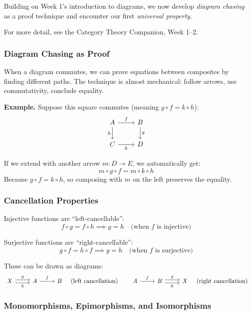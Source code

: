 \begin{goingdeeper}
Building on Week 1's introduction to diagrams, we now develop \emph{diagram chasing} as a proof technique and encounter our first \emph{universal property}.

For more detail, see the Category Theory Companion, Week 1--2.

\subsubsection*{Diagram Chasing as Proof}

When a diagram commutes, we can prove equations between composites by finding different paths. The technique is almost mechanical: follow arrows, use commutativity, conclude equality.

\textbf{Example.} Suppose this square commutes (meaning $g \circ f = k \circ h$):
\[
\begin{tikzcd}
A \arrow[r, "f"] \arrow[d, "h"'] & B \arrow[d, "g"] \\
C \arrow[r, "k"'] & D
\end{tikzcd}
\]

If we extend with another arrow $m: D \to E$, we automatically get:
\[
m \circ g \circ f = m \circ k \circ h
\]
Because $g \circ f = k \circ h$, so composing with $m$ on the left preserves the equality.

\subsubsection*{Cancellation Properties}

Injective functions are ``left-cancellable'':
\[
f \circ g = f \circ h \implies g = h \quad \text{(when } f \text{ is injective)}
\]

Surjective functions are ``right-cancellable'':
\[
g \circ f = h \circ f \implies g = h \quad \text{(when } f \text{ is surjective)}
\]

These can be drawn as diagrams:
\[
\begin{tikzcd}
X \arrow[r, shift left, "g"] \arrow[r, shift right, "h"'] & A \arrow[r, "f"] & B
\end{tikzcd}
\quad\text{(left cancellation)}
\qquad
\begin{tikzcd}
A \arrow[r, "f"] & B \arrow[r, shift left, "g"] \arrow[r, shift right, "h"'] & X
\end{tikzcd}
\quad\text{(right cancellation)}
\]

\subsubsection*{Monomorphisms, Epimorphisms, and Isomorphisms}


\end{goingdeeper}
